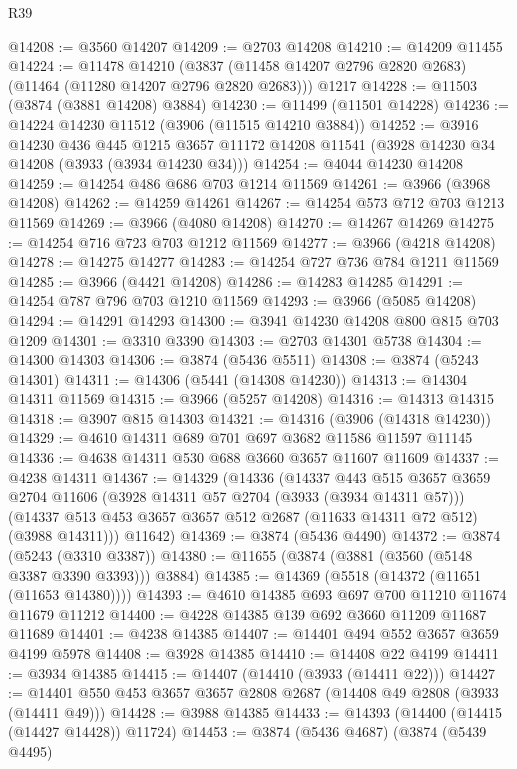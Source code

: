 \begin{lexlean}{R39}
\begin{coremodule}
@14208 := @3560 @14207
@14209 := @2703 @14208
@14210 := @14209 @11455
@14224 := @11478
    @14210
    (@3837 (@11458 @14207 @2796 @2820 @2683) (@11464 (@11280 @14207 @2796 @2820 @2683)))
    @1217
@14228 := @11503 (@3874 (@3881 @14208) @3884)
@14230 := @11499 (@11501 @14228)
@14236 := @14224 @14230 @11512 (@3906 (@11515 @14210 @3884))
@14252 := @3916
    @14230
    @436
    @445
    @1215
    @3657
    @11172
    @14208
    @11541
    (@3928 @14230 @34 @14208 (@3933 (@3934 @14230 @34)))
@14254 := @4044 @14230 @14208
@14259 := @14254 @486 @686 @703 @1214 @11569
@14261 := @3966 (@3968 @14208)
@14262 := @14259 @14261
@14267 := @14254 @573 @712 @703 @1213 @11569
@14269 := @3966 (@4080 @14208)
@14270 := @14267 @14269
@14275 := @14254 @716 @723 @703 @1212 @11569
@14277 := @3966 (@4218 @14208)
@14278 := @14275 @14277
@14283 := @14254 @727 @736 @784 @1211 @11569
@14285 := @3966 (@4421 @14208)
@14286 := @14283 @14285
@14291 := @14254 @787 @796 @703 @1210 @11569
@14293 := @3966 (@5085 @14208)
@14294 := @14291 @14293
@14300 := @3941 @14230 @14208 @800 @815 @703 @1209
@14301 := @3310 @3390
@14303 := @2703 @14301 @5738
@14304 := @14300 @14303
@14306 := @3874 (@5436 @5511)
@14308 := @3874 (@5243 @14301)
@14311 := @14306 (@5441 (@14308 @14230))
@14313 := @14304 @14311 @11569
@14315 := @3966 (@5257 @14208)
@14316 := @14313 @14315
@14318 := @3907 @815 @14303
@14321 := @14316 (@3906 (@14318 @14230))
@14329 := @4610 @14311 @689 @701 @697 @3682 @11586 @11597 @11145
@14336 := @4638 @14311 @530 @688 @3660 @3657 @11607 @11609
@14337 := @4238 @14311
@14367 := @14329
    (@14336
      (@14337
        @443
        @515
        @3657
        @3659
        @2704
        @11606
        (@3928 @14311 @57 @2704 (@3933 (@3934 @14311 @57)))
        (@14337 @513 @453 @3657 @3657 @512 @2687 (@11633 @14311 @72 @512) (@3988 @14311)))
      @11642)
@14369 := @3874 (@5436 @4490)
@14372 := @3874 (@5243 (@3310 @3387))
@14380 := @11655 (@3874 (@3881 (@3560 (@5148 @3387 @3390 @3393))) @3884)
@14385 := @14369 (@5518 (@14372 (@11651 (@11653 @14380))))
@14393 := @4610 @14385 @693 @697 @700 @11210 @11674 @11679 @11212
@14400 := @4228 @14385 @139 @692 @3660 @11209 @11687 @11689
@14401 := @4238 @14385
@14407 := @14401 @494 @552 @3657 @3659 @4199 @5978
@14408 := @3928 @14385
@14410 := @14408 @22 @4199
@14411 := @3934 @14385
@14415 := @14407 (@14410 (@3933 (@14411 @22)))
@14427 := @14401 @550 @453 @3657 @3657 @2808 @2687 (@14408 @49 @2808 (@3933 (@14411 @49)))
@14428 := @3988 @14385
@14433 := @14393 (@14400 (@14415 (@14427 @14428)) @11724)
@14453 := @3874
    (@5436 @4687)
    (@3874
      (@5439 @4495)

\end{coremodule}
\end{lexlean}

